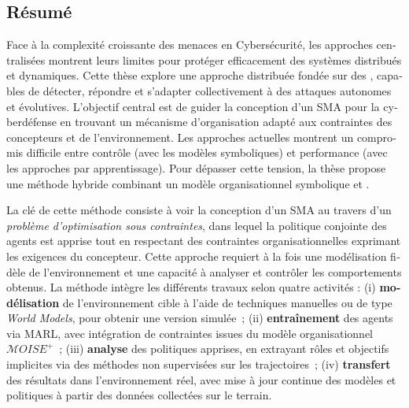 \renewcommand{\abstractname}{Abstract}
\begingroup
\let\clearpage\relax
\let\cleardoublepage\relax
\let\cleardoublepage\relax

\begin{otherlanguage}{ngerman}
    \chapter*{Résumé}

    Face à la complexité croissante des menaces en Cybersécurité, les approches centralisées montrent leurs limites pour protéger efficacement des systèmes distribués et dynamiques. Cette thèse explore une approche distribuée fondée sur des , capables de détecter, répondre et s'adapter collectivement à des attaques autonomes et évolutives.
    L'objectif central est de guider la conception d'un SMA pour la cyberdéfense en trouvant un mécanisme d'organisation adapté aux contraintes des concepteurs et de l'environnement. Les approches actuelles montrent un compromis difficile entre contrôle (avec les modèles symboliques) et performance (avec les approches par apprentissage). Pour dépasser cette tension, la thèse propose une méthode hybride combinant un modèle organisationnel symbolique et .

    La clé de cette méthode consiste à voir la conception d'un SMA au travers d'un \textit{problème d'optimisation sous contraintes}, dans lequel la politique conjointe des agents est apprise tout en respectant des contraintes organisationnelles exprimant les exigences du concepteur. Cette approche requiert à la fois une modélisation fidèle de l'environn\-ement et une capacité à analyser et contrôler les comportements obtenus.
    La méthode intègre les différents travaux selon quatre activités : (i) \textbf{modélisation} de l'environnement cible à l'aide de techniques manuelles ou de type \textit{World Models}, pour obtenir une version simulée~; (ii) \textbf{entraînement} des agents via MARL, avec intégration de contraintes issues du modèle organisationnel $\mathcal{M}OISE^+$~; (iii) \textbf{analyse} des politiques apprises, en extrayant rôles et objectifs implicites via des méthodes non supervisées sur les trajectoires~; (iv) \textbf{transfert} des résultats dans l'environnement réel, avec mise à jour continue des modèles et politiques à partir des données collectées sur le terrain.


\end{otherlanguage}
